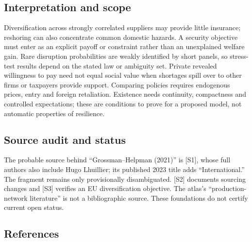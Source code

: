 \documentclass[11pt,a4paper]{article}
\begin{document}
\subsection*{Interpretation and scope}
Diversification across strongly correlated suppliers may provide little insurance; reshoring can also concentrate common domestic hazards. A security objective must enter as an explicit payoff or constraint rather than an unexplained welfare gain. Rare disruption probabilities are weakly identified by short panels, so stress-test results depend on the stated law or ambiguity set. Private revealed willingness to pay need not equal social value when shortages spill over to other firms or taxpayers provide support. Comparing policies requires endogenous prices, entry and foreign retaliation. Existence needs continuity, compactness and controlled expectations; these are conditions to prove for a proposed model, not automatic properties of resilience.

\subsection*{Source audit and status}
The probable source behind ``Grossman–Helpman (2021)'' is [S1], whose full authors also include Hugo Lhuillier; its published 2023 title adds ``International.'' The fragment remains only provisionally disambiguated. [S2] documents sourcing changes and [S3] verifies an EU diversification objective. The atlas’s ``production-network literature'' is not a bibliographic source. These foundations do not certify current open status.

\subsection*{References}
\end{document}
